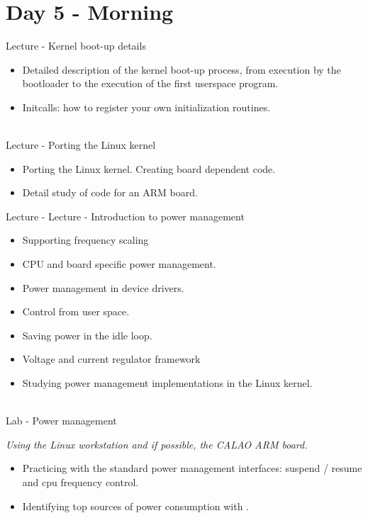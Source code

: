 \documentclass[a4paper,12pt,obeyspaces,spaces,hyphens]{article}
\begin{document}
\section{Day 5 - Morning}
\feagendaonecolumn
{Lecture - Kernel boot-up details}
{
  \begin{itemize}
  \item Detailed description of the kernel boot-up process, from
    execution by the bootloader to the execution of the first
    userspace program.
  \item Initcalls: how to register your own initialization routines.
  \end{itemize}
}
\\
\feagendatwocolumn
{Lecture - Porting the Linux kernel}
{
  \begin{itemize}
  \item Porting the Linux kernel. Creating board dependent code.
  \item Detail study of code for an ARM board.
  \end{itemize}
}
{Lecture - Lecture - Introduction to power management}
{
  \begin{itemize}
  \item Supporting frequency scaling
  \item CPU and board specific power management.
  \item Power management in device drivers.
  \item Control from user space.
  \item Saving power in the idle loop.
  \item Voltage and current regulator framework
  \item Studying power management implementations in the Linux kernel.
  \end{itemize}
}
\\
\feagendaonecolumn
{Lab - Power management}
{
  {\em Using the Linux workstation and if possible, the CALAO ARM
    board.}
  \begin{itemize}
  \item Practicing with the standard power management interfaces:
    suspend / resume and cpu frequency control.
  \item Identifying top sources of power consumption with
    .
  \end{itemize}
}
\end{document}

